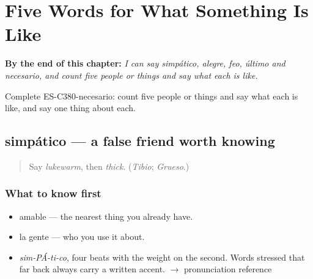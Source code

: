 
\chapter{Five Words for What Something Is Like}
\label{ch:simpatico-y-alegre}

\begin{chapteropening}
\textbf{By the end of this chapter:} \emph{I can say simpático, alegre, feo, último and necesario, and count five people or things and say what each is like.}

Complete ES-C380-necesario: count five people or things and say what each is like, and say one thing about each.
\end{chapteropening}

\section[simpático]{simpático — a false friend worth knowing}

\label{lesson:ES-C380-simpatico}



\begin{quote}
Say \emph{lukewarm}, then \emph{thick}. (\emph{Tibio}; \emph{Grueso}.)
\end{quote}

\subsection*{What to know first}
\begin{itemize}
\raggedright
  \item amable — the nearest thing you already have.
  \item la gente — who you use it about.
\end{itemize}

\begin{sounds}
\begin{itemize}
\raggedright
  \item \emph{sim-PÁ-ti-co}, four beats with the weight on the second. Words stressed that far back always carry a written accent. $\to$ pronunciation reference
\end{itemize}
\end{sounds}


